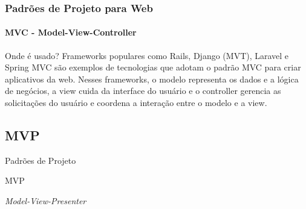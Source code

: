 \documentclass[
	9pt, %
	t, %
]{beamer}
\begin{document}
\begin{frame}
	\frametitle{Padrões de Projeto para Web}
	\framesubtitle{MVC - Model-View-Controller}

	\begin{block}{Onde é usado?}
		Frameworks populares como Rails, Django (MVT), Laravel e Spring MVC são exemplos de tecnologias que adotam o padrão MVC para criar aplicativos da web. Nesses frameworks, o modelo representa os dados e a lógica de negócios, a view cuida da interface do usuário e o controller gerencia as solicitações do usuário e coordena a interação entre o modelo e a view.
	\end{block}

\end{frame}


\subsection{MVP}

\begin{frame}
	\begin{center}

		\bigskip\bigskip\bigskip\bigskip %
		{\Large Padrões de Projeto}

		\bigskip\bigskip %
		{\Huge MVP}

		\smallskip
		{\small \textit{Model-View-Presenter}}
	\end{center}

\end{frame}
\end{document}
